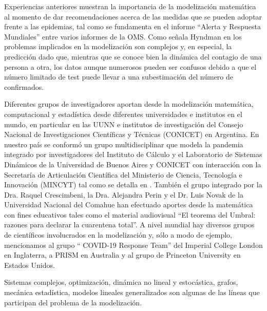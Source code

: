 \documentclass{article}
\begin{document}
Experiencias anteriores muestran la importancia de la modelización matemática al momento de dar recomendaciones acerca de las medidas que se pueden adoptar frente a las epidemias, tal como se fundamenta  en el informe  ``Alerta y Respuesta Mundiales''  \citep{OMS} entre varios informes de la OMS. Como señala Hyndman en \cite{hyn1} los problemas implicados en  la modelización son complejos y, en especial,  la predicción dado que, mientras que se conoce  bien la dinámica del contagio de una persona a otra, los datos aunque  numerosos pueden ser confusos debido a  que el número limitado de test puede llevar a una subestimación del número de confirmados.   



Diferentes grupos de investigadores aportan desde la modelización matemática,  computacional y estadística desde diferentes universidades e institutos en el mundo, en particular en las UUNN  e institutos de investigación del  Consejo Nacional de Investigaciones Científicas  y Técnicas (CONICET)   en Argentina. En nuestro país se conformó un grupo multidisciplinar que modela la pandemia integrado por investigadores del Instituto de Cálculo y el Laboratorio de Sistemas Dinámicos de la Universidad de Buenos Aires y CONICET con interacción con la  Secretaría de Articulación Científica  del Ministerio de Ciencia, Tecnología e Innovación (MINCYT)  tal como se detalla en \cite{icuba}. También el grupo integrado por la Dra. Raquel Crescimbeni, la Dra. Alejandra Perin y el Dr. Luis Novak de la Universidad Nacional del Comahue han efectuado  aportes desde la matemática con fines educativos tales como el material audiovisual ``El teorema del Umbral: razones para declarar la cuarentena total''.  A nivel mundial hay diversos grupos de científicos involucrados en la modelización y, sólo a modo de ejemplo, mencionamos al grupo  `` COVID-19 Response Team'' del Imperial College London \citep{fergu2020} en Inglaterra, a  PRISM \citep{prism} en Australia y al grupo de Princeton University \cite{princet} en Estados Unidos. 
 


 Sistemas complejos, optimización, dinámica no lineal y estocástica, grafos, mecánica estadística, modelos lineales generalizados son algunas de las líneas que participan del problema de la modelización.
\end{document}
